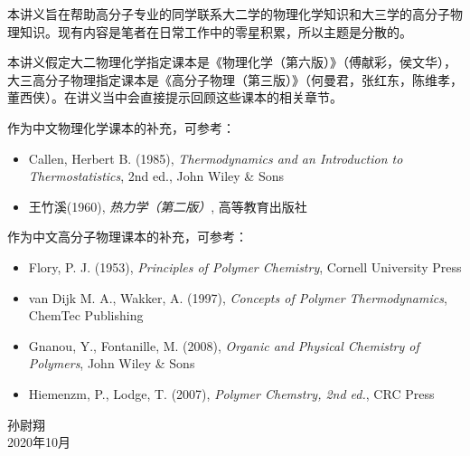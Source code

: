 \documentclass[main.tex]{subfiles}
\begin{document}
本讲义旨在帮助高分子专业的同学联系大二学的物理化学知识和大三学的高分子物理知识。现有内容是笔者在日常工作中的零星积累，所以主题是分散的。

本讲义假定大二物理化学指定课本是《物理化学（第六版）》（傅献彩，侯文华），大三高分子物理指定课本是《高分子物理（第三版）》（何曼君，张红东，陈维孝，董西侠）。在讲义当中会直接提示回顾这些课本的相关章节。

作为中文物理化学课本的补充，可参考：
\begin{itemize}
\item Callen, Herbert B. (1985), \emph{Thermodynamics and an Introduction to Thermostatistics}, 2nd ed., John Wiley \& Sons
\item 王竹溪(1960), \emph{热力学（第二版）}, 高等教育出版社
\end{itemize}
作为中文高分子物理课本的补充，可参考：
\begin{itemize}
\item Flory, P. J. (1953), \emph{Principles of Polymer Chemistry}, Cornell University Press
\item van Dijk M. A., Wakker, A. (1997), \emph{Concepts of Polymer Thermodynamics}, ChemTec Publishing
    \item Gnanou, Y., Fontanille, M. (2008), \emph{Organic and Physical Chemistry of Polymers}, John Wiley \& Sons
    \item Hiemenzm, P., Lodge, T. (2007), \emph{Polymer Chemstry, 2nd ed.}, CRC Press
\end{itemize}



\begin{flushright}
孙尉翔\\
2020年10月
\end{flushright}
\end{document}
